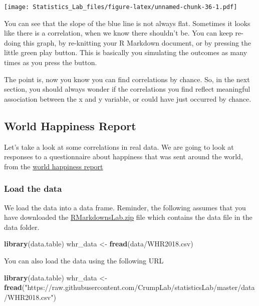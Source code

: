 \documentclass[
]{book}
\newenvironment{Shaded}{\begin{snugshade}}{\end{snugshade}}
\newcommand{\FunctionTok}[1]{\textcolor[rgb]{0.13,0.29,0.53}{\textbf{#1}}}
\newcommand{\NormalTok}[1]{#1}
\newcommand{\OtherTok}[1]{\textcolor[rgb]{0.56,0.35,0.01}{#1}}
\newcommand{\StringTok}[1]{\textcolor[rgb]{0.31,0.60,0.02}{#1}}
\begin{document}
\texttt{[image: Statistics\_Lab\_files/figure-latex/unnamed-chunk-36-1.pdf]}

You can see that the slope of the blue line is not always flat. Sometimes it looks like there is a correlation, when we know there shouldn't be. You can keep re-doing this graph, by re-knitting your R Markdown document, or by pressing the little green play button. This is basically you simulating the outcomes as many times as you press the button.

The point is, now you know you can find correlations by chance. So, in the next section, you should always wonder if the correlations you find reflect meaningful association between the x and y variable, or could have just occurred by chance.

\hypertarget{world-happiness-report}{%
\subsection{World Happiness Report}\label{world-happiness-report}}

Let's take a look at some correlations in real data. We are going to look at responses to a questionnaire about happiness that was sent around the world, from the \href{http://worldhappiness.report}{world happiness report}

\hypertarget{load-the-data}{%
\subsubsection{Load the data}\label{load-the-data}}

We load the data into a data frame. Reminder, the following assumes that you have downloaded the \href{https://github.com/CrumpLab/statisticsLab/raw/master/RMarkdownsLab.zip}{RMarkdownsLab.zip} file which contains the data file in the data folder.

\begin{Shaded}
\begin{Highlighting}[]
\FunctionTok{library}\NormalTok{(data.table)}
\NormalTok{whr\_data }\OtherTok{\textless{}{-}} \FunctionTok{fread}\NormalTok{(}\StringTok{\textquotesingle{}data/WHR2018.csv\textquotesingle{}}\NormalTok{)}
\end{Highlighting}
\end{Shaded}

You can also load the data using the following URL

\begin{Shaded}
\begin{Highlighting}[]
\FunctionTok{library}\NormalTok{(data.table)}
\NormalTok{whr\_data }\OtherTok{\textless{}{-}} \FunctionTok{fread}\NormalTok{(}\StringTok{"https://raw.githubusercontent.com/CrumpLab/statisticsLab/master/data/WHR2018.csv"}\NormalTok{)}
\end{Highlighting}
\end{Shaded}
\end{document}
